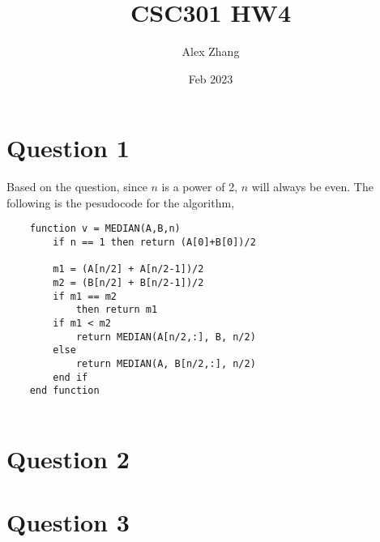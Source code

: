 \documentclass{article}
\title{CSC301 HW4}
\author{Alex Zhang}
\date{Feb 2023}
\begin{document}
\maketitle


\section*{Question 1}
Based on the question, since $n$ is a power of 2, $n$ will always be even. The following is the pesudocode for the algorithm,
\begin{verbatim}
    function v = MEDIAN(A,B,n)
        if n == 1 then return (A[0]+B[0])/2
        
        m1 = (A[n/2] + A[n/2-1])/2
        m2 = (B[n/2] + B[n/2-1])/2
        if m1 == m2 
            then return m1
        if m1 < m2
            return MEDIAN(A[n/2,:], B, n/2)
        else
            return MEDIAN(A, B[n/2,:], n/2)
        end if
    end function
        
\end{verbatim}


\section*{Question 2}





\section*{Question 3}
\end{document}
